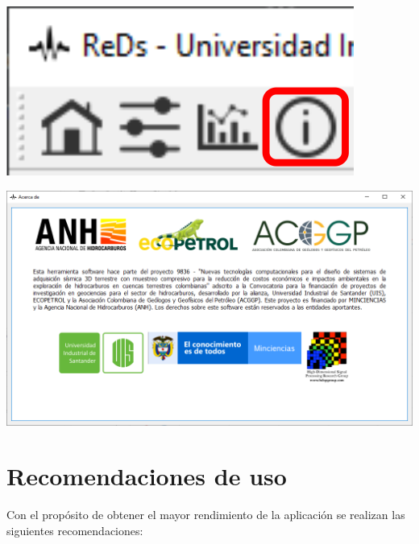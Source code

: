 \documentclass[12pt,twoside,letter]{ol-softwaremanual}
\newenvironment{Figure}
  {\par\medskip\noindent\minipage{\linewidth}}
  {\endminipage\par\medskip}
\begin{document}
\begin{Figure}
    \centering
    \includegraphics[width=0.25\linewidth]{about-tab.png}
    \label{fig:about_tab}
\end{Figure}

\begin{Figure}
    \centering
    \includegraphics[width=1\linewidth]{about.png}
    \label{fig:about_of}
\end{Figure}

\cleardoublepage

\section{Recomendaciones de uso}

Con el propósito de obtener el mayor rendimiento de la aplicación se realizan las siguientes recomendaciones:
\end{document}
